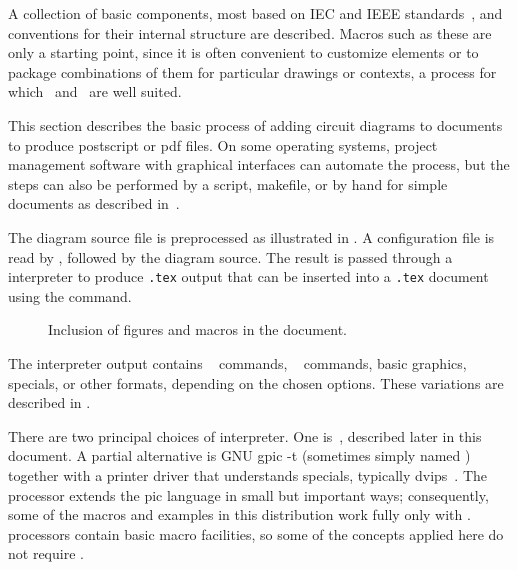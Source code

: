 A collection of basic components, most based on IEC and IEEE
standards~\cite{IECstd,IEEEstd},
and conventions for their internal
structure are described.  Macros such as these are only a starting
point, since it is often convenient to customize elements or to package
combinations of them for particular drawings or contexts,
a process for which \Mfour\ and \pic\ are well suited.

This section describes the basic process of adding circuit diagrams to
\latex documents to produce postscript or pdf files.  On some operating
systems, project management software with graphical interfaces can
automate the process, but the steps can also be performed by a script,
makefile, or by hand for simple documents as described in~.

The diagram source file is preprocessed as illustrated in
.  A configuration file is read by \Mfour,
followed by the diagram source.
The result is passed through a
\pic interpreter to produce {\tt .tex} output that can be inserted
into a {\tt .tex} document using the \verb|| command.

\begin{figure}[ht]
 \caption{Inclusion of figures and macros in the \latex document.
 \label{Flowdiag}}
 \end{figure}

\noindent
The interpreter output contains
\TPGF~\cite{tikz} commands,
\PSTricks~\cite{pstricks} commands,
basic \latex graphics, 
\tpic specials, or other formats,
depending on the chosen options.
These variations are described in .

There are two principal choices of \pic interpreter.  One is~\dpic,
described later in this document.  A partial alternative is
GNU {\bq gpic -t} (sometimes simply named \pic)~\cite{gpic}
together with a printer driver
that understands \tpic specials, typically {\bq dvips}~\cite{dvips}.
The \dpic processor extends the pic language in small but important ways;
consequently, some of the macros and examples in this distribution work fully
only with \dpic.
\Pic processors contain basic macro facilities, so some of the
concepts applied here do not require \Mfour.

